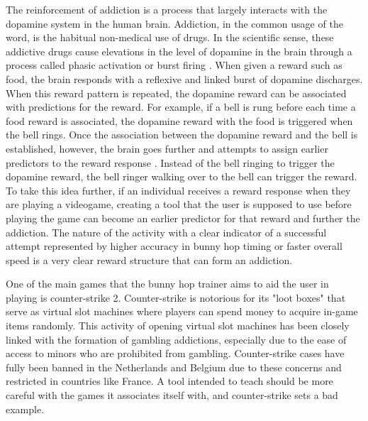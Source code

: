 \documentclass[10pt,twocolumn]{article}
\begin{document}
The reinforcement of addiction is a process that largely interacts with the dopamine system in the human brain. Addiction, in the common usage of the word, is the habitual non-medical use of drugs. In the scientific sense, these addictive drugs cause elevations in the level of dopamine in the brain through a process called phasic activation or burst firing \cite{DopamineAndAddiction}. When given a reward such as food, the brain responds with a reflexive and linked burst of dopamine discharges. When this reward pattern is repeated, the dopamine reward can be associated with predictions for the reward. For example, if a bell is rung before each time a food reward is associated, the dopamine reward with the food is triggered when the bell rings. Once the association between the dopamine reward and the bell is established, however, the brain goes further and attempts to assign earlier predictors to the reward response \cite{DopamineAndAddiction}. Instead of the bell ringing to trigger the dopamine reward, the bell ringer walking over to the bell can trigger the reward. To take this idea further, if an individual receives a reward response when they are playing a videogame, creating a tool that the user is supposed to use before playing the game can become an earlier predictor for that reward and further the addiction. The nature of the activity with a clear indicator of a successful attempt represented by higher accuracy in bunny hop timing or faster overall speed is a very clear reward structure that can form an addiction.

One of the main games that the bunny hop trainer aims to aid the user in playing is counter-strike 2. Counter-strike is notorious for its "loot boxes" that serve as virtual slot machines where players can spend money to acquire in-game items randomly. This activity of opening virtual slot machines has been closely linked with the formation of gambling addictions, especially due to the ease of access to minors who are prohibited from gambling\cite{CSGambling}. Counter-strike cases have fully been banned in the Netherlands and Belgium due to these concerns and restricted in countries like France\cite{NoMoreCases}. A tool intended to teach should be more careful with the games it associates itself with, and counter-strike sets a bad example.
\end{document}
